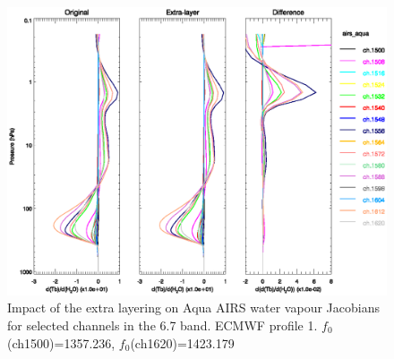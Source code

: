 \begin{figure}[htp]
  \centering
  \includegraphics[scale=0.8]{graphics/airs_aqua.h2o_k_el.p1.eps}
  \caption{Impact of the extra layering on Aqua AIRS water vapour Jacobians for selected channels in the 6.7\micron{} \water{} band. ECMWF profile 1. $f_{0}$(ch1500)=1357.236\invcm, $f_{0}$(ch1620)=1423.179\invcm }
  \label{fig:airs_aqua.h2o_k_el.p1}
\end{figure}


